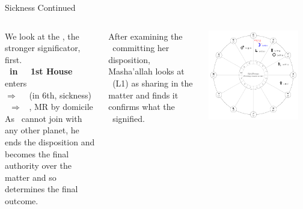 \begin{frame}[t]{Sickness Continued}
\begin{columns}[T, onlytextwidth]
We look at the \Moon, the stronger significator, first. \\
\vspace{0.2cm}
\textbf{\Moon\ in \Taurus\ \Trine\ 1st House} enters \Gemini \\
$\Rightarrow$ \Square\ \Venus\ (in 6th, sickness)  \\
\Venus\ $\Rightarrow$ \Sextile\ \Jupiter, MR by domicile \\

\vspace{0.2cm}
As \Jupiter\ cannot join with any other planet\footnotemark[1], he ends the disposition and becomes the final authority over the matter and so determines the final outcome.

\vspace{0.2cm}
After examining the \Moon\ committing her disposition, Masha'allah looks at \Mercury\ (L1) as sharing in the matter and finds it confirms what the \Moon\ signified.



\begin{center}
{\includegraphics[width=0.9\textwidth]{charts/21a-chart-sickness}} \\
\vspace{-0.2cm}
\end{center}
\end{columns}
\end{frame}
